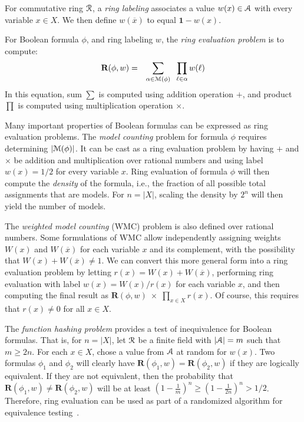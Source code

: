 \documentclass[letterpaper,USenglish,cleveref, autoref, thm-restate]{lipics-v2021}
\newcommand{\obar}[1]{\overline{#1}}
\newcommand{\lit}{\ell}
\newcommand{\varset}{X}
\newcommand{\ring}{{\cal R}}
\newcommand{\dset}{{\cal A}}
\newcommand{\rep}{\textbf{R}}
\newcommand{\radd}{+}
\newcommand{\rmul}{\times}
\newcommand{\mulident}{\textbf{1}}
\newcommand{\modelset}{{\cal M}}
\begin{document}
\begin{definition}
\label{def:ring_evaluation}
  For commutative ring $\ring$, a {\em ring labeling} associates a value $w(x) \in \dset$ with
  every variable $x \in \varset$.  We then define $w(\obar{x})$ to equal $\mulident-w(x)$.

  For Boolean formula $\phi$, and ring labeling $w$, the {\em ring evaluation problem} is to compute:
  \begin{eqnarray}
    \rep(\phi, w) & = & \sum_{\alpha \in \modelset(\phi)} \;\; \prod_{\lit \in \alpha} w(\ell) \label{eqn:rep}
  \end{eqnarray}
  In this equation, sum $\sum$ is computed using addition operation $\radd$, and product $\prod$ is computed using multiplication operation $\rmul$.
\label{def:labeling}
\end{definition}

Many important properties of Boolean formulas can be
expressed as ring evaluation problems.  The
{\em model counting} problem for formula $\phi$ requires determining $|\modelset(\phi)|$.
It can be cast as a ring evaluation problem by having $\radd$ and
$\rmul$ be addition and multiplication over rational numbers and using
label $w(x) = 1/2$ for every variable $x$.
Ring evaluation of formula $\phi$ will then compute the {\em density} of
the formula, i.e., the fraction of all possible total assignments that are
models.  For $n = |\varset|$, scaling the density by $2^n$ will then
yield the number of models.

The {\em weighted model counting} (WMC) problem is also defined over
rational numbers.  Some formulations of WMC allow
independently assigning weights $W(x)$ and $W(\obar{x})$ for each variable $x$ and its complement, with the possibility that
$W(x) + W(\obar{x}) \not = 1$.
We can convert this more general form into a
ring evaluation problem by letting $r(x) = W(x) + W(\obar{x})$,
performing ring evaluation with label $w(x) = W(x)/r(x)$ for each
variable $x$, and then computing the final result as $\rep(\phi, w)\;
\rmul\; \prod_{x \in \varset} r(x)$.  Of course, this requires that $r(x) \not = 0$ for all $x \in \varset$.

The {\em function hashing problem} provides a test
of inequivalence for Boolean formulas.  That is, for $n = |\varset|$, let $\ring$ be a
finite  field with $|\dset| = m$ such that $m \geq 2 n$.  For each $x \in \varset$, chose a value from $\dset$ at random for $w(x)$.  Two formulas
$\phi_1$ and $\phi_2$ will clearly have $\rep(\phi_1, w) = \rep(\phi_2, w)$
if they are logically equivalent.  If they are not equivalent, then
the probability that $\rep(\phi_1, w) \not = \rep(\phi_2, w)$ will be at
least $\left(1-\frac{1}{m}\right)^n \geq \left(1-\frac{1}{2n}\right)^n > 1/2$.
Therefore, ring evaluation can be used as part of a
randomized algorithm for equivalence testing~\cite{blum:ipl:1980}.
\end{document}

